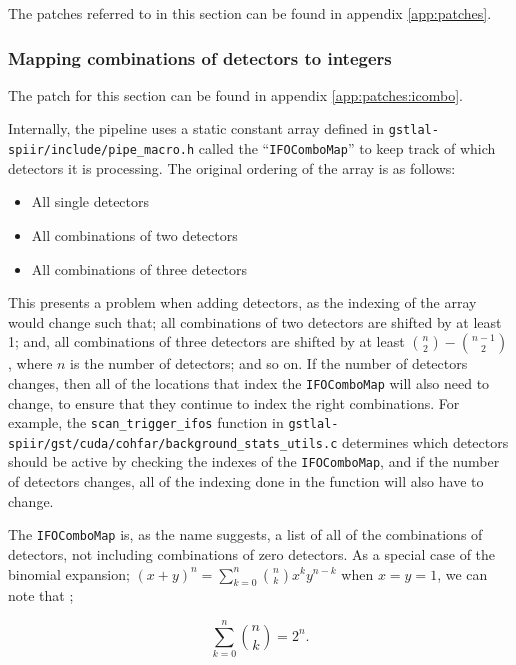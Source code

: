 \documentclass{article}
\begin{document}
The patches referred to in this section can be found in appendix \ref{app:patches}.

\subsubsection{Mapping combinations of detectors to integers} \label{sec:final_design:patches:ifocombo}

The patch for this section can be found in appendix \ref{app:patches:icombo}.

Internally, the pipeline uses a static constant array defined in \texttt{gstlal-spiir/include/pipe\_macro.h} called the ``\texttt{IFOComboMap}'' to keep track of which detectors it is processing.
The original ordering of the array is as follows:
\begin{itemize}
    \item All single detectors
    \item All combinations of two detectors
    \item All combinations of three detectors
\end{itemize}

This presents a problem when adding detectors, as the indexing of the array would change such that; all combinations of two detectors are shifted by at least 1; and, all combinations of three detectors are shifted by at least \(\binom{n}{2}-\binom{n-1}{2}\), where \(n\) is the number of detectors; and so on.
If the number of detectors changes, then all of the locations that index the \texttt{IFOComboMap} will also need to change, to ensure that they continue to index the right combinations.
For example, the \texttt{scan\_trigger\_ifos} function in \texttt{gstlal-spiir/gst/cuda/cohfar/background\_stats\_utils.c} determines which detectors should be active by checking the indexes of the \texttt{IFOComboMap}, and if the number of detectors changes, all of the indexing done in the function will also have to change.

The \texttt{IFOComboMap} is, as the name suggests, a list of all of the combinations of detectors, not including combinations of zero detectors.
As a special case of the binomial expansion;
\( (x + y)^n = \sum^n_{k=0}\binom{n}{k}x^ky^{n-k} \) when \(x = y = 1\), we can note that \cite{CLRS_combinations};

\begin{equation}
    \label{eq:power2}
    \sum^n_{k=0}\binom{n}{k} = 2^n.
\end{equation}
\end{document}
